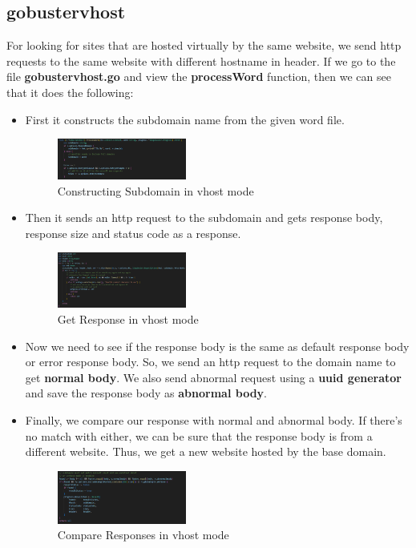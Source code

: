\documentclass[12 pt]{article}
\begin{document}
\subsection{gobustervhost}
For looking for sites that are hosted virtually by the same website, we send http requests to the same website with different hostname in header. If we go to the file \textbf{gobustervhost.go} and view the \textbf{processWord} function, then we can see that it does the following:
\begin{itemize}
    \item First it constructs the subdomain name from the given word file.
    \begin{figure}[!htbp]
        \centering
        \includegraphics[width=0.4\textwidth]{Gobustervhost_Construct_Subdomain.png}
        \caption{Constructing Subdomain in vhost mode}
        \label{fig: Gobustervhost Constructing Subdomain}
    \end{figure}
    \item Then it sends an http request to the subdomain and gets response body, response size and status code as a response.
    \begin{figure}[!htbp]
        \centering
        \includegraphics[width=0.4\textwidth]{Gobustervhost_Get_Response.png}
        \caption{Get Response in vhost mode}
        \label{fig: Gobustervhost Get Response}
    \end{figure}
    \item Now we need to see if the response body is the same as default response body or error response body. So, we send an http request to the domain name to get \textbf{normal body}. We also send abnormal request using a \textbf{uuid generator} and save the response body as \textbf{abnormal body}.
    \item Finally, we compare our response with normal and abnormal body. If there’s no match with either, we can be sure that the response body is from a different website. Thus, we get a new website hosted by the base domain.
    \begin{figure}[!htbp]
        \centering
        \includegraphics[width=0.4\textwidth]{Gobustervhost_Compare_Response.png}
        \caption{Compare Responses in vhost mode}
        \label{fig: Gobustervhost Compare Response}
    \end{figure}
\end{itemize}
\end{document}
